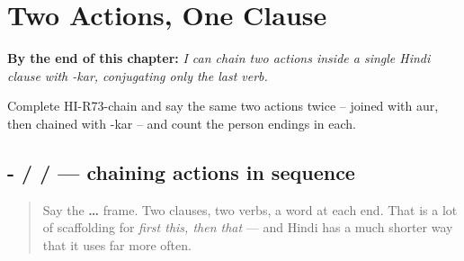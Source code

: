 
\chapter{Two Actions, One Clause}
\label{ch:hi-chained-actions}

\begin{chapteropening}
\textbf{By the end of this chapter:} \emph{I can chain two actions inside a single Hindi clause with -kar, conjugating only the last verb.}

Complete HI-R73-chain and say the same two actions twice -- joined with aur, then chained with -kar -- and count the person endings in each.
\end{chapteropening}

\section[\texorpdfstring{-\hi{कर} / \hi{देखकर} / \hi{करके} (-kar / dekhkar …)}{-कर / देखकर / करके (-kar / dekhkar …)}]{- /  /  — chaining actions in sequence}

\label{lesson:HI-C73-kar}



\begin{quote}
Say the \textbf{ … } frame. Two clauses, two verbs, a word at each end. That is a lot of scaffolding for \emph{first this, then that} — and Hindi has a much shorter way that it uses far more often.
\end{quote}


